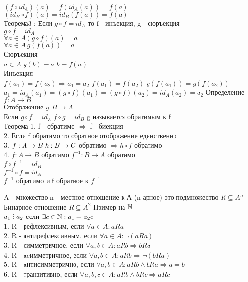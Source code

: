 $ (f \circ id_A)(a) = f(id_A(a)) = f(a) $ \\
$ (id_B \circ f)(a) = id_B(f(a)) = f(a) $ \\
Теорема3 : Если $ g \circ f = id_A$ то f - инъекция, g - сюръекция \\
$ g \circ f = id_A $ \\
$ \forall a \in A (g \circ f )(a) = a $\\
$ \forall a \in A \ g(f(a)) = a $ \\
Сюръекция \\
$ a \in A $ $ g(b) = a $ $ b = f(a)$\\
Инъекция \\
$ f(a_1) = f(a_2) \Rightarrow a_1 = a_2 $
$ f(a_1) = f(a_2) $ $g(f(a_1)) = g(f(a_2)) $ \\
$ a_1 = id_A(a_1) = (g \circ f )(a_1) = (g \circ f)(a_2) = id_A(a_2) =  a_2 $
Определение $ f: A \rightarrow B $ \\
Отображение $ g: B \rightarrow A $ \\
Если $ g \circ f = id_A $ $ f \circ g = id_B $ g называется обратимым к f \\
Теорема 1. f - обратимо $\Leftrightarrow$ f - биекция\\
2. Если f обратимо то обратное отображение единственно\\
3. $ f: A \rightarrow  B \hspace{1mm} h: B \rightarrow C $ обратимо $ \Rightarrow h \circ f $ обратимо\\
4. $ f: A \rightarrow B $ обратимо $ f^{-1} : B \rightarrow A$ обратимо\\
$ f \circ f^{-1} = id_B $ \\
$ f^{-1} \circ f = id_A $ \\
$ f^{-1} $ обратимо и f обратное к $ f^{-1} $ \\


A - множество
n - местное отношение к А (n-арное)
это подмножество $ R \subseteq A^n $
Бинарное отношение $ R \subseteq A^2 $
Пример на $\mathbb{N}$ \\
$ a_1 \divby a_2$ если $ \exists c \in \mathbb{N} : a_1 = a_2 c$\\
1. R - рефлексивным, если $ \forall a \in A : aRa $ \\
2. R - антирефлексивным, если $ \forall a \in A : \neg (aRa) $\\
3. R - симметричное, если $ \forall a,b \in A : aRb \Rightarrow bRa $\\
4. R - acимметричное, если $ \forall a,b \in A: aRb \Rightarrow \neg (bRa) $ \\
5. R - aнтисимметрично, если $ \forall a, b \in A : aRb \wedge bRa \Rightarrow a = b $ \\
6. R - транзитивно, если $ \forall a, b, c \in A : aRb \wedge bRc \Rightarrow aRc $ \\

